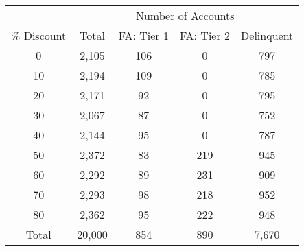 \begin{tabular}{ccccc}
\toprule 
\midrule 
 & \multicolumn{4}{c}{Number of Accounts} \\
 \cmidrule(lr){2-5} 
\% Discount & Total & FA: Tier 1 & FA: Tier 2 & Delinquent \\
\midrule 
0 & 2,105 & 106 & 0 & 797 \\
10 & 2,194 & 109 & 0 & 785 \\
20 & 2,171 & 92 & 0 & 795 \\
30 & 2,067 & 87 & 0 & 752 \\
40 & 2,144 & 95 & 0 & 787 \\
50 & 2,372 & 83 & 219 & 945 \\
60 & 2,292 & 89 & 231 & 909 \\
70 & 2,293 & 98 & 218 & 952 \\
80 & 2,362 & 95 & 222 & 948 \\
\midrule 
Total & 20,000 & 854 & 890 & 7,670 \\
\midrule 
\bottomrule 
\end{tabular}
